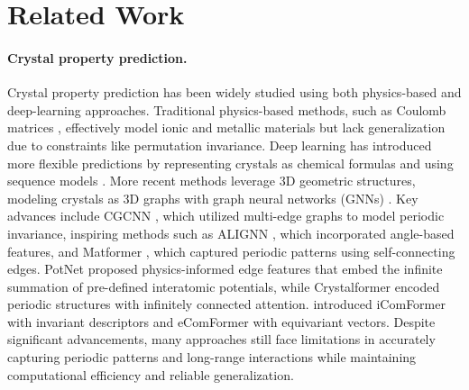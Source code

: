 \section{Related Work}
\paragraph{Crystal property prediction.} 
Crystal property prediction has been widely studied using both physics-based and deep-learning approaches. Traditional physics-based methods, such as Coulomb matrices \citep{rupp2012fast, elton2018applying}, effectively model ionic and metallic materials but lack generalization due to constraints like permutation invariance. Deep learning has introduced more flexible predictions by representing crystals as chemical formulas and using sequence models \citep{jha2018elemnet, goodall2020predicting, wang2021compositionally}. More recent methods leverage 3D geometric structures, modeling crystals as 3D graphs with graph neural networks (GNNs) \citep{schutt2017schnet, gasteiger2020directional}. Key advances include CGCNN \citep{xie2018crystal}, which utilized multi-edge graphs to model periodic invariance, inspiring methods such as ALIGNN \citep{choudhary2021atomistic}, which incorporated angle-based features, and Matformer \citep{yan2022periodic}, which captured periodic patterns using self-connecting edges. PotNet \citep{lin2023efficient} proposed physics-informed edge features that embed the infinite summation of pre-defined interatomic potentials, while Crystalformer \citep{taniai2024crystalformer} encoded periodic structures with infinitely connected attention. \cite{yan2024complete} introduced iComFormer with invariant descriptors and eComFormer with equivariant vectors. Despite significant advancements, many approaches still face limitations in accurately capturing periodic patterns and long-range interactions while maintaining computational efficiency and reliable generalization.


